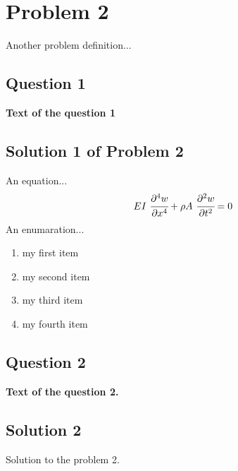 \documentclass[]{report}
\begin{document}
\section*{Problem 2}
Another problem definition...
\subsection*{Question 1}
\textbf{Text of the question 1}
\begin{center}
\subsection*{Solution 1 of Problem 2}
\end{center}
An equation...
\begin{align*}
 EI~\cfrac{\partial^4 w}{\partial x^4} + \rho A~\cfrac{\partial^2 w}{\partial t^2} = 0
\end{align*}
An enumaration...\\
\begin{enumerate}
\item {my first item}
\item {my second item }
\item {my third item }
\item {my fourth item }
\end{enumerate}
\subsection*{Question 2}
\textbf{Text of the question 2.}
\begin{center}
\subsection*{Solution 2}
\end{center}
Solution to the problem 2.




\end{document}

